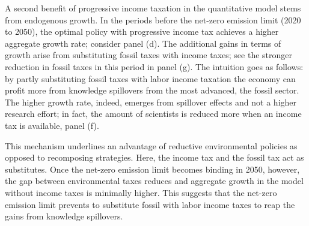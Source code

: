 A second benefit of progressive income taxation in the quantitative model stems from endogenous growth. 
In the periods before the net-zero emission limit (2020 to 2050), the optimal policy with progressive income tax achieves a higher aggregate growth rate; consider panel (d). The additional gains in terms of growth arise from substituting fossil taxes with income taxes; see the stronger reduction in fossil taxes in this period in panel (g).  The intuition goes as follows: by partly substituting fossil taxes with labor income taxation the economy can profit more from knowledge spillovers from the most advanced, the fossil sector. The higher growth rate, indeed, emerges from spillover effects and not a higher research effort; in fact, the amount of scientists is reduced more when an income tax is available, panel (f). %

 This mechanism underlines an advantage of reductive environmental policies as opposed to recomposing strategies. Here, the income tax and the fossil tax act as substitutes. %
Once the net-zero emission limit becomes binding in 2050, however, the gap between environmental taxes reduces and aggregate growth in the model without income taxes is minimally higher.   This suggests that the net-zero emission limit prevents to substitute fossil with labor income taxes to reap the gains from knowledge spillovers. 

